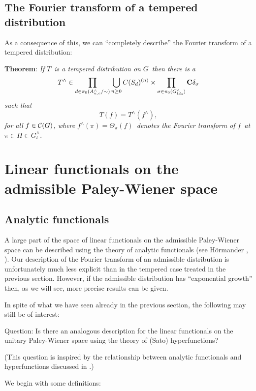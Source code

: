 \documentclass[11pt, a4paper]{article}
\begin{document}
\subsection{The Fourier transform of a tempered distribution}

As a consequence of this, we can ``completely describe'' the Fourier
transform of a tempered distribution:

{\bf Theorem}: {\em If }$T${\em \ is a tempered distribution on }$G${\em \
then there is a}
\[
T^{\wedge }\in \prod_{d\in \pi _0(A_{u,c}^{\wedge }/\sim )}\bigcup_{n\geq
0}C(S_d)^{(n)}\times \prod_{\sigma \in \pi _0(G_{lds}^{\wedge })}{\bf %
C}\delta _\sigma
\]
{\em such that}
\[
T(f)=T^{\wedge }(f^{\wedge }),
\]
{\em for all }$f\in {\cal C}(G)${\em , where }$f^{\wedge }(\pi )=\Theta _\pi
(f)${\em \ denotes the Fourier transform of }$f${\em \ at }$\pi \in \Pi \in
G_t^{\wedge }$.

\section{Linear functionals on the admissible Paley-Wiener space}

\subsection{Analytic functionals}

A large part of the space of linear functionals on the admissible
Paley-Wiener space can be described using the theory of analytic functionals
(see H\"ormander \cite[ch.~IV]{H1}, \cite[ch.~IX]{H2}). Our description of the Fourier
transform of an admissible distribution is unfortunately much less explicit
than in the tempered case treated in the previous section. However, if the
admissible distribution has ``exponential growth'' then, as we will see,
more precise results can be given.

In spite of what we have seen already in the previous section, the following
may still be of interest:

{\sc Question}: Is there an analogous description for the linear
functionals on the unitary Paley-Wiener space using the theory of (Sato)
hyperfunctions?

(This question is inspired by the relationship between analytic functionals
and hyperfunctions discussed in \cite[\S 9.2]{H2}.)

We begin with some definitions:
\end{document}
